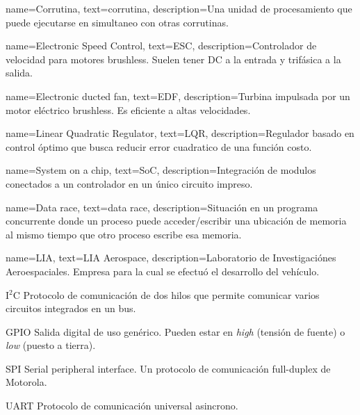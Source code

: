 \usepackage[sort=none,abbreviations]{glossaries-extra}

{
	name=Corrutina,
    text=corrutina,
	description={Una unidad de procesamiento que puede ejecutarse en simultaneo con otras corrutinas.}
}

{
	name=Electronic Speed Control,
	text=ESC,
	description={Controlador de velocidad para motores brushless. Suelen tener DC a la entrada y trifásica a la salida.}
}

{
	name=Electronic ducted fan,
	text=EDF,
	description={Turbina impulsada por un motor eléctrico brushless. Es eficiente a altas velocidades.}
}

{
	name=Linear Quadratic Regulator,
	text=LQR,
	description={Regulador basado en control óptimo que busca reducir error cuadratico de una función costo.}
}

{
	name=System on a chip,
	text=SoC,
	description={Integración de modulos conectados a un controlador en un único circuito impreso.}
}

{
	name=Data race,
	text=data race,
	description={Situación en un programa concurrente donde un proceso puede acceder/escribir una ubicación de memoria al mismo tiempo que otro proceso escribe esa memoria.}
}

{
	name=LIA,
	text=LIA Aerospace,
	description={Laboratorio de Investigaciónes Aeroespaciales. Empresa para la cual se efectuó el desarrollo del vehículo.}
}

{I$^2$C}
{Protocolo de comunicación de dos hilos que permite comunicar varios circuitos integrados en un bus.}

{GPIO}
{Salida digital de uso genérico. Pueden estar en \emph{high} (tensión de fuente) o \emph{low} (puesto a tierra).}

{SPI}
{Serial peripheral interface. Un protocolo de comunicación full-duplex de Motorola.}

{UART}
{Protocolo de comunicación universal asincrono.}
